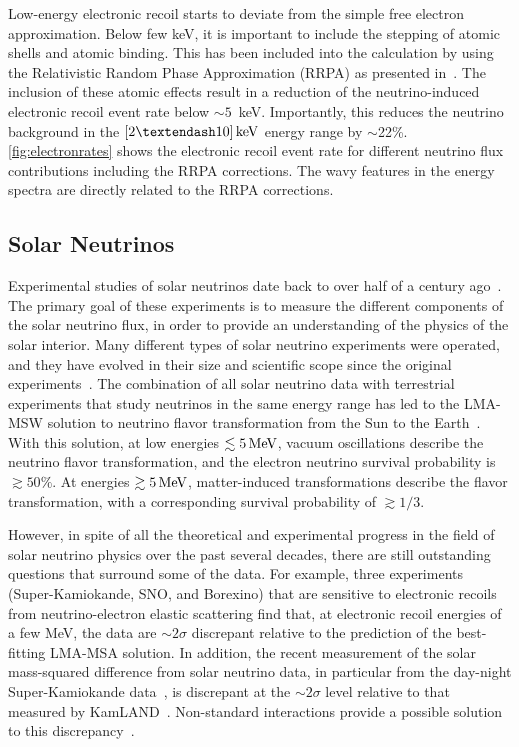 Low-energy electronic recoil starts to deviate from the simple free electron approximation. Below few keV, it is important to include the stepping of atomic shells and atomic binding. This has been included into the calculation by using the Relativistic Random Phase Approximation (RRPA) as presented in~\cite{Chen:2016eab}. The inclusion of these atomic effects result in a reduction of the neutrino-induced electronic recoil event rate below $\sim 5$~keV. Importantly, this reduces the neutrino background in the $[2–10]\1{keV}$ energy range by $\sim$22\%. \autoref{fig:electronrates} shows the electronic recoil event rate for different neutrino flux contributions including the RRPA corrections. The wavy features in the energy spectra are directly related to the RRPA corrections.

\subsection{Solar Neutrinos}\label{sec:solarneutrinos}

Experimental studies of solar neutrinos date back to over half of a century ago~\cite{Bahcall:1976zz}. The primary goal of these experiments is to measure the different components of the solar neutrino flux, in order to provide an understanding of the physics of the solar interior. Many different types of solar neutrino experiments were operated, and they have evolved in their size and scientific scope since the original experiments~\cite{Robertson:2012ib}. The combination of all solar neutrino data with terrestrial experiments that study neutrinos in the same energy range has led to the LMA-MSW solution to neutrino flavor transformation from the Sun to the Earth~\cite{deHolanda:2002dko}. With this solution, at low energies $\lesssim 5\, \mathrm{MeV}$, vacuum oscillations describe the neutrino flavor transformation, and the electron neutrino survival probability is $\gtrsim 50\%$. At energies $\gtrsim 5\, \mathrm{MeV}$, matter-induced transformations describe the flavor transformation, with a corresponding survival probability of $\gtrsim 1/3$. 

However, in spite of all the theoretical and experimental progress in the field of solar neutrino physics over the past several decades, there are still outstanding questions that surround some of the data. For example, three experiments (Super-Kamiokande, SNO, and Borexino) that are sensitive to electronic recoils from neutrino-electron elastic scattering find that, at electronic recoil energies of a few MeV, the data are $\sim 2\sigma$ discrepant relative to the prediction of the best-fitting LMA-MSA solution. In addition, the recent measurement of the solar mass-squared difference from solar neutrino data, in particular from the day-night Super-Kamiokande data~\cite{Abe:2016nxk}, is discrepant at the $\sim 2 \sigma$ level relative to that measured by KamLAND~\cite{Gando:2010aa}. Non-standard interactions provide a possible solution to this discrepancy~\cite{Liao:2017awz}. 

